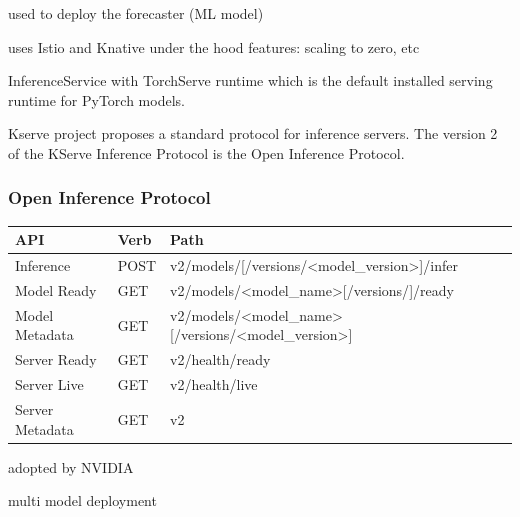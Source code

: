 used to deploy the forecaster (ML model)


uses Istio and Knative under the hood
features: scaling to zero, etc


InferenceService with TorchServe runtime which is the default installed serving runtime for PyTorch models.

Kserve project proposes a standard protocol for inference servers.
The version 2 of the KServe Inference Protocol is the Open Inference Protocol.



\subsubsection{Open Inference Protocol}


\begin{table}[h!]
\centering
\begin{tabular}{|l|l|l|}
\hline
\textbf{API}    & \textbf{Verb} & \textbf{Path}                                                                                         \\ \hline
Inference       & POST          & v2/models/{[}/versions/\textless{}model\_version\textgreater{}{]}/infer                               \\ \hline
Model Ready     & GET           & v2/models/\textless{}model\_name\textgreater{}{[}/versions/{]}/ready                                  \\ \hline
Model Metadata  & GET           & v2/models/\textless{}model\_name\textgreater{}{[}/versions/\textless{}model\_version\textgreater{}{]} \\ \hline
Server Ready    & GET           & v2/health/ready                                                                                       \\ \hline
Server Live     & GET           & v2/health/live                                                                                        \\ \hline
Server Metadata & GET           & v2                                                                                                    \\ \hline
\end{tabular}
\end{table}





adopted by NVIDIA



multi model deployment



